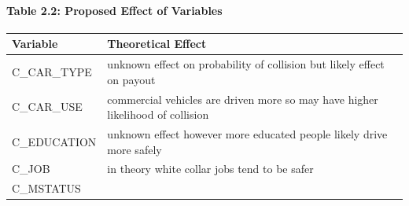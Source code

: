 \documentclass[]{article}
\let\oldparagraph\paragraph
\renewcommand{\paragraph}[1]{\oldparagraph{#1}\mbox{}}
\begin{document}
\paragraph{Table 2.2: Proposed Effect of
Variables}\label{table-2.2-proposed-effect-of-variables}

\begin{longtable}[]{@{}ll@{}}
\toprule
\begin{minipage}[b]{0.18\columnwidth}\raggedright\strut
Variable
\strut\end{minipage} &
\begin{minipage}[b]{0.76\columnwidth}\raggedright\strut
Theoretical Effect
\strut\end{minipage}\tabularnewline
\midrule
\endhead
\begin{minipage}[t]{0.18\columnwidth}\raggedright\strut
C\_CAR\_TYPE
\strut\end{minipage} &
\begin{minipage}[t]{0.76\columnwidth}\raggedright\strut
unknown effect on probability of collision but likely effect on payout
\strut\end{minipage}\tabularnewline
\begin{minipage}[t]{0.18\columnwidth}\raggedright\strut
C\_CAR\_USE
\strut\end{minipage} &
\begin{minipage}[t]{0.76\columnwidth}\raggedright\strut
commercial vehicles are driven more so may have higher likelihood of
collision
\strut\end{minipage}\tabularnewline
\begin{minipage}[t]{0.18\columnwidth}\raggedright\strut
C\_EDUCATION
\strut\end{minipage} &
\begin{minipage}[t]{0.76\columnwidth}\raggedright\strut
unknown effect however more educated people likely drive more safely
\strut\end{minipage}\tabularnewline
\begin{minipage}[t]{0.18\columnwidth}\raggedright\strut
C\_JOB
\strut\end{minipage} &
\begin{minipage}[t]{0.76\columnwidth}\raggedright\strut
in theory white collar jobs tend to be safer
\strut\end{minipage}\tabularnewline
\begin{minipage}[t]{0.18\columnwidth}\raggedright\strut
C\_MSTATUS
\strut\end{minipage} &
\begin{minipage}[t]{0.76\columnwidth}\raggedright\strut

\end{minipage}
\end{longtable}
\end{document}
